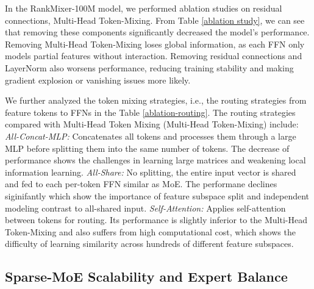 In the RankMixer-100M model, we performed ablation studies on residual connections, Multi-Head Token-Mixing. From Table \ref{ablation study}, we can see that removing these components significantly decreased the model's performance. Removing Multi-Head Token-Mixing loses global information, as each FFN only models partial features without interaction. Removing residual connections and LayerNorm also worsens performance, reducing training stability and making gradient explosion or vanishing issues more likely.
% 
        
We further analyzed the token mixing strategies, i.e., the routing strategies from feature tokens to FFNs in the Table \ref{ablation-routing}. The routing strategies compared with Multi-Head Token Mixing (Multi-Head Token-Mixing) include: \textit{All-Concat-MLP:} Concatenates all tokens and processes them through a large MLP before splitting them into the same number of tokens. The decrease of performance shows the challenges in learning large matrices and weakening local information learning. \textit{All-Share:} No splitting, the entire input vector is shared and fed to each per-token FFN similar as MoE. The performane declines siginifantly which show the importance of feature subspace split and independent modeling contrast to all-shared input.
\textit{Self-Attention:} Applies self-attention between tokens for routing. Its performance is slightly inferior to the Multi-Head Token-Mixing and also suffers from high computational cost, which shows the difficulty of learning similarity across hundreds of different feature subspaces. 

\subsection{Sparse-MoE Scalability and Expert Balance}
\label{sec:smr_results}

